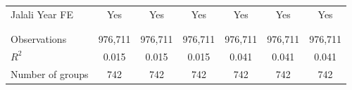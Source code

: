 \documentclass[border=0.2cm]{standalone}
\begin{document}
\begin{tabular}{lcccccc}
    Jalali Year FE         & Yes                                            & Yes                                            & Yes                                            & Yes                                            & Yes                                            & Yes                                            \\
    \vspace{4pt}           &                                                &                                                &                                                &                                                &                                                &                                                \\
    \vspace{4pt}           & \begin{footnotesize}\end{footnotesize}         & \begin{footnotesize}\end{footnotesize}         & \begin{footnotesize}\end{footnotesize}         & \begin{footnotesize}\end{footnotesize}         & \begin{footnotesize}\end{footnotesize}         & \begin{footnotesize}\end{footnotesize}         \\
    Observations           & 976,711                                        & 976,711                                        & 976,711                                        & 976,711                                        & 976,711                                        & 976,711                                        \\
    $R^2$                  & 0.015                                          & 0.015                                          & 0.015                                          & 0.041                                          & 0.041                                          & 0.041                                          \\
    Number of groups       & 742                                            & 742                                            & 742                                            & 742                                            & 742                                            & 742                                            \\

\end{tabular}
\end{document}

